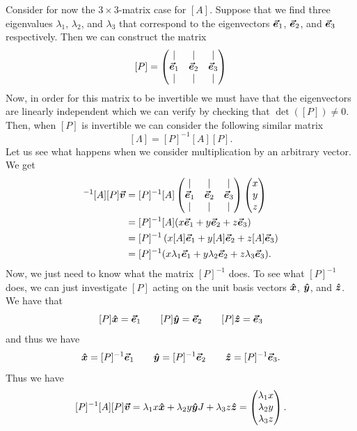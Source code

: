             Consider for now the $3\times 3$-matrix case for $[A]$. Suppose that we find three eigenvalues $\lambda_1$, $\lambda_2$, and $\lambda_3$ that correspond to the eigenvectors $\boldsymbol{\vec{e}}_1$, $\boldsymbol{\vec{e}}_2$, and $\boldsymbol{\vec{e}}_3$ respectively.  Then we can construct the matrix
            \[
            [P]=\begin{pmatrix} \vert & \vert & \vert \\ \boldsymbol{\vec{e}}_1 & \boldsymbol{\vec{e}}_2 & \boldsymbol{\vec{e}}_3 \\ \vert & \vert & \vert \end{pmatrix}
            \]
            Now, in order for this matrix to be invertible we must have that the eigenvectors are linearly independent which we can verify by checking that $\det([P])\neq 0$. Then, when $[P]$ is invertible we can consider the following similar matrix
            \[
            [\Lambda] = [P]^{-1}[A][P].
            \]
            Let us see what happens when we consider multiplication by an arbitrary vector. We get
            \begin{align*}
                [P]^{-1}[A][P]\vecv &= [P]^{-1}[A]\begin{pmatrix} \vert & \vert & \vert \\ \evec_1 & \evec_2 & \evec_3 \\ \vert & \vert & \vert \end{pmatrix} \begin{pmatrix} x \\ y \\ z \end{pmatrix} \\
                &= [P]^{-1}[A](x\evec_1 + y \evec_2 + z\evec_3)\\
                &= [P]^{-1}\left( x [A]\evec_1 + y [A]\evec_2 + z [A]\evec_3 \right)\\
                &= [P]^{-1}( x \lambda_1 \evec_1 + y \lambda_2 \evec_2 + z \lambda_3 \evec_3).
            \end{align*}
            Now, we just need to know what the matrix $[P]^{-1}$ does.  To see what $[P]^{-1}$ does, we can just investigate $[P]$ acting on the unit basis vectors $\boldsymbol{\hat{x}}$, $\boldsymbol{\hat{y}}$, and $\boldsymbol{\hat{z}}$.  We have that
            \[
            [P]\boldsymbol{\hat{x}} = \boldsymbol{\vec{e}}_1 \qquad [P]\boldsymbol{\hat{y}} = \boldsymbol{\vec{e}}_2 \qquad [P]\boldsymbol{\hat{z}} =\boldsymbol{\vec{e}}_3
            \]
            and thus we have
            \[
            \boldsymbol{\hat{x}} = [P]^{-1}\boldsymbol{\vec{e}}_1 \qquad \boldsymbol{\hat{y}} = [P]^{-1} \boldsymbol{\vec{e}}_2 \qquad \boldsymbol{\hat{z}} = [P]^{-1}\boldsymbol{\vec{e}}_3.
            \]
            Thus we have
            \[
            [P]^{-1}[A][P] \boldsymbol{\boldsymbol{\vec{v}}} = \lambda_1 x \boldsymbol{\hat{x}} + \lambda_2 y \boldsymbol{\hat{y}} J+ \lambda_3 z\boldsymbol{\hat{z}} = \begin{pmatrix} \lambda_1 x \\ \lambda_2 y \\ \lambda_3 z \end{pmatrix}.
            \]

